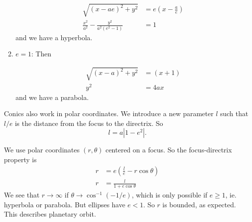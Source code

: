 \documentclass[a4paper]{article}
\begin{document}
\begin{enumerate}
\begin{center}
          \end{center}
          \begin{align*}
            \sqrt{(x - ae)^2 + y^2} &= e\left(x - \frac{a}{e}\right)\\
            \frac{x^2}{a^2} - \frac{y^2}{a^2(e^2 - 1)} &= 1
          \end{align*}
          and we have a hyperbola.
        \item $e = 1$: Then
          \begin{center}
          \end{center}
          \begin{align*}
            \sqrt{(x - a)^2 + y^2} &= (x + 1)\\
            y^2 &= 4ax
          \end{align*}
          and we have a parabola.
      \end{enumerate}

      Conics also work in polar coordinates. We introduce a new parameter $l$ such that $l/e$ is the distance from the focus to the directrix. So
      \[
        l = a|1 - e^2|.
      \]

      We use polar coordinates $(r, \theta)$ centered on a focus. So the focus-directrix property is
      \begin{align*}
        r &= e\left(\frac{l}{e} - r\cos\theta\right)\\
        r &= \frac{l}{1 + e\cos\theta}
      \end{align*}
      We see that $r\to \infty$ if $\theta \to \cos^{-1}(-1/e)$, which is only possible if $e\geq 1$, ie. hyperbola or parabola. But ellipses have $e < 1$. So $r$ is bounded, as expected. This describes planetary orbit.
\end{document}
